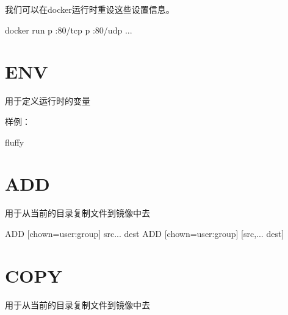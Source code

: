 \documentclass[letterpaper,10pt,english]{sphinxmanual}
\begin{document}
我们可以在docker运行时重设这些设置信息。

%
\begin{sphinxVerbatim}[commandchars=\\\{\}]
docker run \PYGZhy{}p :80/tcp \PYGZhy{}p :80/udp ...
\end{sphinxVerbatim}


\section{ENV}
\label{\detokenize{_u8fd0_u884c_u5e94_u7528/05-dockerfile_u53c2_u8003:env}}
用于定义运行时的变量

%
\begin{sphinxVerbatim}[commandchars=\\\{\}]
\end{sphinxVerbatim}

样例：

%
\begin{sphinxVerbatim}[commandchars=\\\{\}]
    fluffy
\end{sphinxVerbatim}


\section{ADD}
\label{\detokenize{_u8fd0_u884c_u5e94_u7528/05-dockerfile_u53c2_u8003:add}}
用于从当前的目录复制文件到镜像中去

%
\begin{sphinxVerbatim}[commandchars=\\\{\}]
ADD [\PYGZhy{}\PYGZhy{}chown=\PYGZlt{}user\PYGZgt{}:\PYGZlt{}group\PYGZgt{}] \PYGZlt{}src\PYGZgt{}... \PYGZlt{}dest\PYGZgt{}
ADD [\PYGZhy{}\PYGZhy{}chown=\PYGZlt{}user\PYGZgt{}:\PYGZlt{}group\PYGZgt{}] [\PYGZdq{}\PYGZlt{}src\PYGZgt{}\PYGZdq{},... \PYGZdq{}\PYGZlt{}dest\PYGZgt{}\PYGZdq{}]
\end{sphinxVerbatim}


\section{COPY}
\label{\detokenize{_u8fd0_u884c_u5e94_u7528/05-dockerfile_u53c2_u8003:copy}}
用于从当前的目录复制文件到镜像中去
\end{document}
